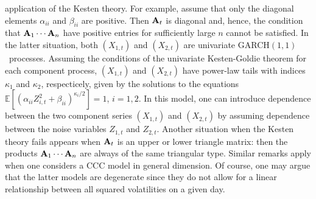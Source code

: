 \documentclass[11pt,a4]{amsart}
\newcommand{\garch}{{\rm GARCH}$(1,1)$}
\newcommand{\bfA}{{\bf A}}
\newcommand{\E }{{\mathbb E}}
\newcommand{\1}{{\mathbf 1}}
\begin{document}
application of the Kesten theory. For example, assume that only the diagonal elements $\alpha_{ii}$ and $\beta_{ii}$ are positive.
Then $\bfA_t$ is diagonal and, hence, the condition that $\bfA_1\cdots\bfA_n$ have positive entries for sufficiently large $n$ 
cannot be satisfied. In the latter situation, both $(X_{1,t})$ and $(X_{2,t})$ are univariate \garch\ processes. Assuming the
conditions of the univariate Kesten-Goldie theorem for each component process, $(X_{1,t})$ and $(X_{2,t})$ have power-law tails
with indices $\kappa_1$ and $\kappa_2$, respecticely,  given by the solutions to the equations 
$\E [(\alpha_{ii} Z_{i,t}^2+\beta_{ii})^{\kappa_i/2}]=1$, $i=1,2$. In this model, one can introduce dependence between the two component series $(X_{1,t})$ and $(X_{2,t})$ by assuming dependence between the noise variables $Z_{1,t}$ and $Z_{2,t}$. Another situation when the Kesten theory fails
appears when $\bfA_t$ is an upper or lower triangle matrix: then the products  $\bfA_1\cdots\bfA_n$ are always of the same triangular type.
Similar remarks apply when one considers a CCC model in general dimension. Of course, one may argue that the latter models
are degenerate since they do not allow for a linear relationship between all squared volatilities
on a given day. 
\end{document}
